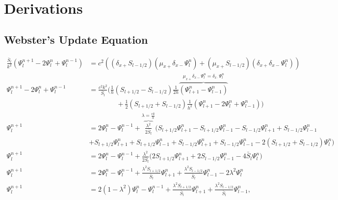 \documentclass[dvipsnames]{article}
\def\dxp{\delta_{x+}}
\def\dxm{\delta_{x-}}
\def\mup{\mu_{x+}}
\def\Sp{S_{l+1/2}}
\def\Sm{S_{l-1/2}}
\def\Psilp{\Psi_{l+1}^n}
\def\Psilm{\Psi_{l-1}^n}
\def\Psinp{\Psi_l^{n+1}}
\def\Psinm{\Psi_l^{n-1}}
\def\Psiln{\Psi_l^n}
\def\Sbar{\bar S_l}
\begin{document}


\appendix
\def\Psinplp{\Psi_{l+1}^{n+1}}
\def\Psinmlp{\Psi_{l+1}^{n-1}}

\section{Derivations}
\subsection{Webster's Update Equation}\label{app:webstersUpdateEq}

\begin{align}
    \frac{\Sbar}{k^2}(\Psinp - 2\Psiln+\Psinm) &= c^2\left((\dxp \Sm)(\mup \dxm \Psiln) + (\mup \Sm)(\dxp \dxm \Psiln)\right)\nonumber\\
    \Psinp - 2\Psiln+\Psinm &= \frac{c^2k^2}{\Sbar}\bigg(\frac{1}{h}(\Sp - \Sm)\frac{1}{2h}\overbrace{(\Psilp -\Psilm)}^{\mup\dxm\Psiln = \delta_{x\cdot}\Psiln}\nonumber\\
    &\qquad\qquad+\frac{1}{2}(\Sp + \Sm)\frac{1}{h^2}(\Psilp-2\Psiln+\Psilm)\bigg)\nonumber\\
    \Psinp &= 2\Psiln-\Psinm + \overbrace{\frac{\lambda^2}{2\Sbar}}^{\lambda = \frac{ck}{h}}\Big(\Sp\Psilp - \Sp\Psilm - \Sm\Psilp + \Sm\Psilm \nonumber\\
    &+ \Sp\Psilp + \Sp\Psilm + \Sm\Psilp + \Sm\Psilm - 2 (\Sp + \Sm)\Psiln\Big)\nonumber\\
    \Psinp &= 2\Psiln-\Psinm+ \frac{\lambda^2}{2\Sbar}\Big(2\Sp\Psilp + 2\Sm\Psilm - 4\Sbar\Psiln\Big)\nonumber\\
    \Psinp &= 2\Psiln-\Psinm+ \frac{\lambda^2\Sp}{\Sbar}\Psilp + \frac{\lambda^2\Sm}{\Sbar}\Psilm - 2\lambda^2\Psiln\nonumber\\
    \Psinp &= 2(1-\lambda^2)\Psiln-\Psinm+ \frac{\lambda^2\Sp}{\Sbar}\Psilp + \frac{\lambda^2\Sm}{\Sbar}\Psilm,
\end{align}
\end{document}
